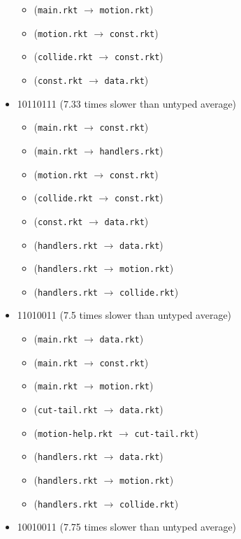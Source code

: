 \documentclass{article}
\newcommand{\mono}[1]{\texttt{#1}}
\begin{document}
\begin{itemize}
\begin{itemize}
  \item (\mono{main.rkt} $\rightarrow$ \mono{motion.rkt})
  \item (\mono{motion.rkt} $\rightarrow$ \mono{const.rkt})
  \item (\mono{collide.rkt} $\rightarrow$ \mono{const.rkt})
  \item (\mono{const.rkt} $\rightarrow$ \mono{data.rkt})
  \end{itemize}
\item 10110111 (7.33 times slower than untyped average)
  \begin{itemize}
  \item (\mono{main.rkt} $\rightarrow$ \mono{const.rkt})
  \item (\mono{main.rkt} $\rightarrow$ \mono{handlers.rkt})
  \item (\mono{motion.rkt} $\rightarrow$ \mono{const.rkt})
  \item (\mono{collide.rkt} $\rightarrow$ \mono{const.rkt})
  \item (\mono{const.rkt} $\rightarrow$ \mono{data.rkt})
  \item (\mono{handlers.rkt} $\rightarrow$ \mono{data.rkt})
  \item (\mono{handlers.rkt} $\rightarrow$ \mono{motion.rkt})
  \item (\mono{handlers.rkt} $\rightarrow$ \mono{collide.rkt})
  \end{itemize}
\item 11010011 (7.5 times slower than untyped average)
  \begin{itemize}
  \item (\mono{main.rkt} $\rightarrow$ \mono{data.rkt})
  \item (\mono{main.rkt} $\rightarrow$ \mono{const.rkt})
  \item (\mono{main.rkt} $\rightarrow$ \mono{motion.rkt})
  \item (\mono{cut-tail.rkt} $\rightarrow$ \mono{data.rkt})
  \item (\mono{motion-help.rkt} $\rightarrow$ \mono{cut-tail.rkt})
  \item (\mono{handlers.rkt} $\rightarrow$ \mono{data.rkt})
  \item (\mono{handlers.rkt} $\rightarrow$ \mono{motion.rkt})
  \item (\mono{handlers.rkt} $\rightarrow$ \mono{collide.rkt})
  \end{itemize}
\item 10010011 (7.75 times slower than untyped average)
  \begin{itemize}

\end{itemize}
\end{itemize}
\end{document}
